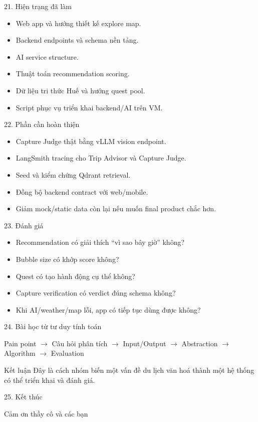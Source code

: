 \documentclass[aspectratio=169]{beamer}
\begin{document}
\begin{frame}{21. Hiện trạng đã làm}
\begin{itemize}
    \item Web app và hướng thiết kế explore map.
    \item Backend endpoints và schema nền tảng.
    \item AI service structure.
    \item Thuật toán recommendation scoring.
    \item Dữ liệu tri thức Huế và hướng quest pool.
    \item Script phục vụ triển khai backend/AI trên VM.
\end{itemize}
\end{frame}

\begin{frame}{22. Phần cần hoàn thiện}
\begin{itemize}
    \item Capture Judge thật bằng vLLM vision endpoint.
    \item LangSmith tracing cho Trip Advisor và Capture Judge.
    \item Seed và kiểm chứng Qdrant retrieval.
    \item Đồng bộ backend contract với web/mobile.
    \item Giảm mock/static data còn lại nếu muốn final product chắc hơn.
\end{itemize}
\end{frame}

\begin{frame}{23. Đánh giá}
\begin{itemize}
    \item Recommendation có giải thích ``vì sao bây giờ'' không?
    \item Bubble size có khớp score không?
    \item Quest có tạo hành động cụ thể không?
    \item Capture verification có verdict đúng schema không?
    \item Khi AI/weather/map lỗi, app có tiếp tục dùng được không?
\end{itemize}
\end{frame}

\begin{frame}{24. Bài học từ tư duy tính toán}
\begin{center}
\Large
Pain point $\rightarrow$ Câu hỏi phân tích $\rightarrow$ Input/Output $\rightarrow$ Abstraction $\rightarrow$ Algorithm $\rightarrow$ Evaluation
\end{center}
\vspace{0.35cm}
\begin{block}{Kết luận}
Đây là cách nhóm biến một vấn đề du lịch văn hoá thành một hệ thống có thể triển khai và đánh giá.
\end{block}
\end{frame}

\begin{frame}{25. Kết thúc}
\begin{center}
\Huge Cảm ơn thầy cô và các bạn
\end{center}
\end{frame}
\end{document}
